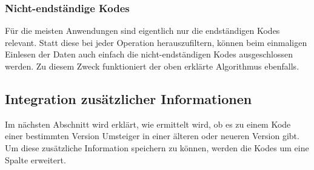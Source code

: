 \subsubsection{Nicht-endständige Kodes}

Für die meisten Anwendungen sind eigentlich nur die endständigen Kodes relevant. Statt diese bei jeder Operation herauszufiltern, können beim einmaligen Einlesen der Daten auch einfach die nicht-endständigen Kodes ausgeschlossen werden. Zu diesem Zweck funktioniert der oben erklärte Algorithmus ebenfalls. 

\subsection{Integration zusätzlicher Informationen}

Im nächsten Abschnitt wird erklärt, wie ermittelt wird, ob es zu einem Kode einer bestimmten Version Umsteiger in einer älteren oder neueren Version gibt. Um diese zusätzliche Information speichern zu können, werden die Kodes um eine Spalte erweitert.

